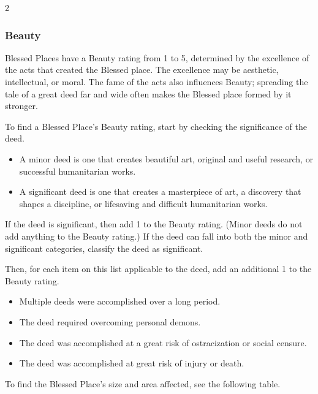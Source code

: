 \begin{multicols}{2}
\subsubsection*{Beauty}

Blessed Places have a Beauty rating from 1 to 5, determined by the excellence of the acts that created the Blessed place. The excellence may be aesthetic, intellectual, or moral. The fame of the acts also influences Beauty; spreading the tale of a great deed far and wide often makes the Blessed place formed by it stronger.

To find a Blessed Place's Beauty rating, start by checking the significance of the deed.
\begin{itemize}
\item A minor deed is one that creates beautiful art, original and useful research, or successful humanitarian works.
\item A significant deed is one that creates a masterpiece of art, a discovery that shapes a discipline, or lifesaving and difficult humanitarian works.
\end{itemize}
If the deed is significant, then add 1 to the Beauty rating. (Minor deeds do not add anything to the Beauty rating.) If the deed can fall into both the minor and significant categories, classify the deed as significant.

Then, for each item on this list applicable to the deed, add an additional 1 to the Beauty rating.

\begin{itemize}
\item Multiple deeds were accomplished over a long period.
\item The deed required overcoming personal demons.
\item The deed was accomplished at a great risk of ostracization or social censure.
\item The deed was accomplished at great risk of injury or death.
\end{itemize}

To find the Blessed Place's size and area affected, see the following table.


	\bigsidebarstart


\end{multicols}
